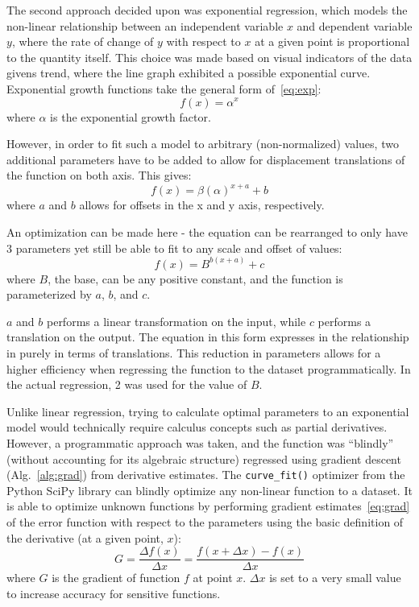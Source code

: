 The second approach decided upon was exponential regression, which models the non-linear relationship between an independent variable $x$ and dependent variable $y$, where the rate of change of $y$ with respect to $x$ at a given point is proportional to the quantity itself.
This choice was made based on visual indicators of the data given\textquotesingle s trend, where the line graph exhibited a possible exponential curve.
Exponential growth functions take the general form of~\eqref{eq:exp}:
%
\begin{equation}
    f(x) = \alpha^x
    \label{eq:exp}
\end{equation}
%
\noindent where $\alpha$ is the exponential growth factor.

However, in order to fit such a model to arbitrary (non-normalized) values, two additional parameters have to be added to allow for displacement translations of the function on both axis. This gives:
%
\begin{equation}
    f(x) = \beta (\alpha)^{x + a} + b
    \label{eq:exp2}
\end{equation}
%
\noindent where $a$ and $b$ allows for offsets in the x and y axis, respectively.

An optimization can be made here - the equation can be rearranged to only have 3 parameters yet still be able to fit to any scale and offset of values:
%
\begin{equation}
    f(x) = B^{b (x + a)} + c
    \label{eq:exp3}
\end{equation}
%
\noindent where $B$, the base, can be any positive constant, and the function is parameterized by $a$, $b$, and $c$.

$a$ and $b$ performs a linear transformation on the input, while $c$ performs a translation on the output.
The equation in this form expresses in the relationship in purely in terms of translations.
This reduction in parameters allows for a higher efficiency when regressing the function to the dataset programmatically.
In the actual regression, 2 was used for the value of $B$.

Unlike linear regression, trying to calculate optimal parameters to an exponential model would technically require calculus concepts such as partial derivatives.
However, a programmatic approach was taken, and the function was ``blindly'' (without accounting for its algebraic structure) regressed using gradient descent (Alg.~\ref{alg:grad}) from derivative estimates.
The \verb|curve_fit()| optimizer from the Python SciPy library can blindly optimize any non-linear function to a dataset.
It is able to optimize unknown functions by performing gradient estimates~\eqref{eq:grad} of the error function with respect to the parameters using the basic definition of the derivative (at a given point, $x$):
%
\begin{equation}
    G = \frac{\Delta f(x)}{\Delta x} = \frac{f(x + \Delta x) - f(x)}{\Delta x}
    \label{eq:grad}
\end{equation}
%
\noindent where $G$ is the gradient of function $f$ at point $x$.
$\Delta x$ is set to a very small value to increase accuracy for sensitive functions.

